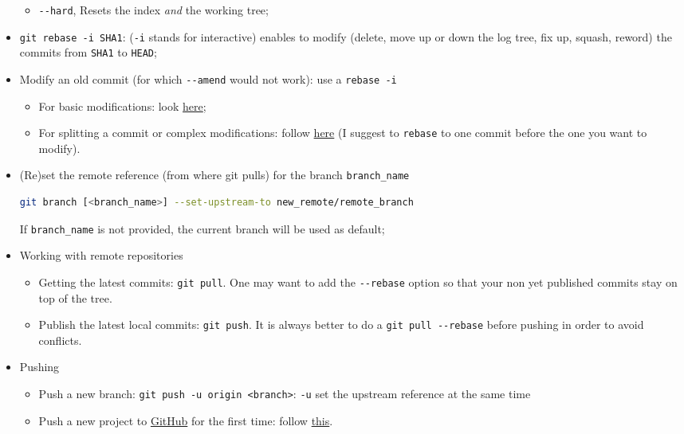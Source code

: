 \documentclass[a4paper,12pt,%
              final%
              ]{article}
\begin{document}
\begin{itemize}
\begin{itemize}
      \item \verb|--hard|, Resets the index \emph{and} the working tree;
    \end{itemize}
  \item \verb|git rebase -i SHA1|: (\texttt{-i} stands for interactive) enables to modify (delete, move up or down the log tree, fix up, squash, reword) the commits from \texttt{SHA1} to \texttt{HEAD};
  \item Modify an old commit (for which \verb|--amend| would not work): use a \texttt{rebase -i}
    \begin{itemize}
      \item For basic modifications: look \href{https://stackoverflow.com/questions/1186535/how-to-modify-a-specified-commit}{here};
      \item For splitting a commit or complex modifications: follow \href{https://stackoverflow.com/questions/6217156/break-a-previous-commit-into-multiple-commits}{here} (I suggest to \texttt{rebase} to one commit before the one you want to modify).
    \end{itemize}
  \item (Re)set the remote reference (from where git pulls) for the branch \verb|branch_name|
\begin{lstlisting}[language=bash]
git branch [<branch_name>] --set-upstream-to new_remote/remote_branch
\end{lstlisting}
    If \verb|branch_name| is not provided, the current branch will be used as default;
  \item Working with remote repositories
    \begin{itemize}
      \item Getting the latest commits: \verb|git pull|. One may want to add the \verb|--rebase| option so that your non yet published commits stay on top of the tree.
      \item Publish the latest local commits: \verb|git push|. It is always better to do a \verb|git pull --rebase| before pushing in order to avoid conflicts.
    \end{itemize}
  \item Pushing
    \begin{itemize}
      \item Push a new branch: \verb|git push -u origin <branch>|: \verb|-u| set the upstream reference at the same time
      \item Push a new project to \href{https://github.com/}{GitHub} for the first time: follow \href{https://help.github.com/en/github/importing-your-projects-to-github/adding-an-existing-project-to-github-using-the-command-line}{this}.

\end{itemize}
\end{itemize}
\end{document}
